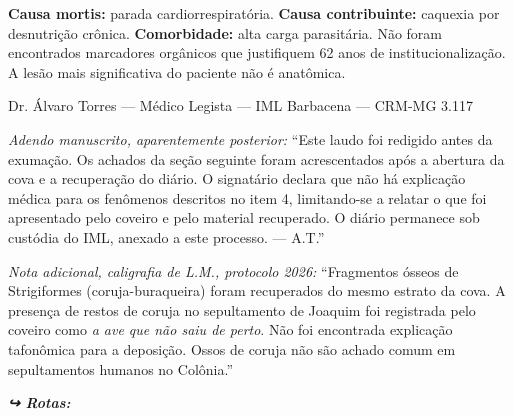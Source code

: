 \noindent \textbf{Causa mortis:} parada cardiorrespiratória. \textbf{Causa contribuinte:} caquexia por desnutrição crônica. \textbf{Comorbidade:} alta carga parasitária. Não foram encontrados marcadores orgânicos que justifiquem 62 anos de institucionalização. A lesão mais significativa do paciente não é anatômica.

\vspace{0.5em}
\noindent Dr. Álvaro Torres --- Médico Legista --- IML Barbacena --- CRM-MG 3.117

\vspace{0.8em}
\noindent \textit{Adendo manuscrito, aparentemente posterior:} ``Este laudo foi redigido antes da exumação. Os achados da seção seguinte foram acrescentados após a abertura da cova e a recuperação do diário. O signatário declara que não há explicação médica para os fenômenos descritos no item 4, limitando-se a relatar o que foi apresentado pelo coveiro e pelo material recuperado. O diário permanece sob custódia do IML, anexado a este processo. --- A.T.''

\vspace{0.5em}
\noindent \textit{Nota adicional, caligrafia de L.M., protocolo 2026:} ``Fragmentos ósseos de Strigiformes (coruja-buraqueira) foram recuperados do mesmo estrato da cova. A presença de restos de coruja no sepultamento de Joaquim foi registrada pelo coveiro como \textit{a ave que não saiu de perto}. Não foi encontrada explicação tafonômica para a deposição. Ossos de coruja não são achado comum em sepultamentos humanos no Colônia.''

\noindent\textit{\textbf{↪ Rotas:}  \rotasep {} \rotasep {} \rotasep {}}
